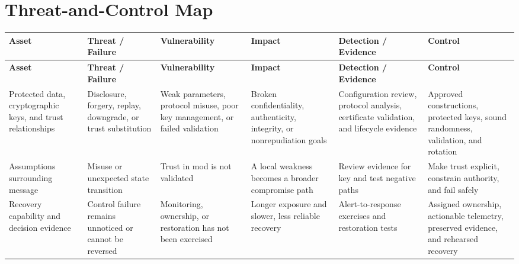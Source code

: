\documentclass[11pt]{article}
\begin{document}
\section*{Threat-and-Control Map}
\begingroup\scriptsize\setlength{\tabcolsep}{2pt}
\begin{longtable}{>{\RaggedRight\arraybackslash}p{}>{\RaggedRight\arraybackslash}p{}>{\RaggedRight\arraybackslash}p{}>{\RaggedRight\arraybackslash}p{}>{\RaggedRight\arraybackslash}p{}>{\RaggedRight\arraybackslash}p{}}
\toprule\rowcolor{Navy}\color{white}\textbf{Asset} & \color{white}\textbf{Threat / Failure} & \color{white}\textbf{Vulnerability} & \color{white}\textbf{Impact} & \color{white}\textbf{Detection / Evidence} & \color{white}\textbf{Control}\\\midrule
\endfirsthead
\toprule\rowcolor{Navy}\color{white}\textbf{Asset} & \color{white}\textbf{Threat / Failure} & \color{white}\textbf{Vulnerability} & \color{white}\textbf{Impact} & \color{white}\textbf{Detection / Evidence} & \color{white}\textbf{Control}\\\midrule
\endhead
Protected data, cryptographic keys, and trust relationships & Disclosure, forgery, replay, downgrade, or trust substitution & Weak parameters, protocol misuse, poor key management, or failed validation & Broken confidentiality, authenticity, integrity, or nonrepudiation goals & Configuration review, protocol analysis, certificate validation, and lifecycle evidence & Approved constructions, protected keys, sound randomness, validation, and rotation\\\midrule
Assumptions surrounding message & Misuse or unexpected state transition & Trust in mod is not validated & A local weakness becomes a broader compromise path & Review evidence for key and test negative paths & Make trust explicit, constrain authority, and fail safely\\\midrule
Recovery capability and decision evidence & Control failure remains unnoticed or cannot be reversed & Monitoring, ownership, or restoration has not been exercised & Longer exposure and slower, less reliable recovery & Alert-to-response exercises and restoration tests & Assigned ownership, actionable telemetry, preserved evidence, and rehearsed recovery\\\midrule
\bottomrule
\end{longtable}
\endgroup
\end{document}
